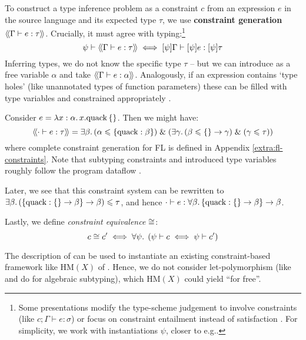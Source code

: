 To construct a type inference problem as a constraint $c$ from an expression $e$ in the source language and its expected type $\tau$, we use \textbf{constraint generation} $\cstr{\Gamma}{e}{\tau}$. Crucially, it must agree with typing:\footnote{Some presentations modify the type-scheme judgement to involve constraints (like $c; \Gamma \vdash e : \sigma$) \cite{essence-of-ml-type-inference} or focus on constraint entailment instead of satisfaction \cite{constraint-based-hm}. For simplicity, we work with instantiations $\psi$, closer to e.g.\@ \cite[Section 3.4]{constraint-based-freeze-ml}.}
$$ \psi \vdash \cstr{\Gamma}{e}{\tau} \iff \substx{\psi}\Gamma \vdash \substx{\psi}{e} : \substx \psi \tau $$
Inferring types, we do not know the specific type $\tau$ -- but we can introduce as a free variable $\alpha$ and take $\cstr{\Gamma}{e}{\alpha}$. Analogously, if an expression contains `type holes' (like unannotated types of function parameters) these can be filled with type variables and constrained appropriately \cite{tapl}.

\begin{example}
    Consider $e = \lambda {x: \alpha} \ldotp {x}{.}{\mathrm{quack}}\,\{\}$. Then we might have:
    $$ \cstr{\cdot}{e}{\tau} = \exists \beta \ldotp (\alpha \sub \flrec{\mathrm{quack}: \beta}) \und \left( \exists \gamma \ldotp (\beta \sub \flrec{} \to \gamma) \und (\gamma \sub \tau) \right) $$
    where complete constraint generation for FL is defined in Appendix \ref{extra:fl-constraints}. Note that subtyping constraints and introduced type variables roughly follow the program dataflow \cite{mlsub}.

    Later, we see that this constraint system can be rewritten to $\exists \beta \ldotp (\flrec{\mathrm{quack} : \flrec{} \to \beta} \to \beta) \sub \tau$, and hence $\cdot \vdash e : \forall \beta \ldotp \flrec{\mathrm{quack} : \flrec{} \to \beta} \to \beta$.
\end{example}

Lastly, we define \emph{constraint equivalence} $\cong$:
$$ c \cong c' \iff  \forall \psi \ldotp \; (\psi \vdash c \iff \psi \vdash c') $$

The description of \inference{} can be used to instantiate an existing constraint-based framework like $\mathrm{HM}(X)$ of \textcite{constraint-based-hm}. Hence, we do not consider let-polymorphism (like \textcite{dolan-thesis} and \textcite{simple-sub} do for algebraic subtyping), which $\mathrm{HM}(X)$ could yield \enquote{for free}.


